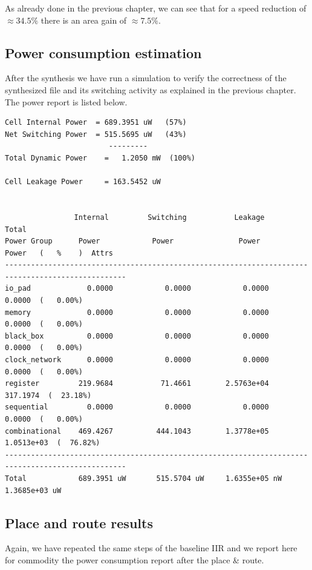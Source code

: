 As already done in the previous chapter, we can see that for a speed reduction of $\approx 34.5\%$ there is an area gain of $\approx 7.5\%$.

\subsection{Power consumption estimation}

After the synthesis we have run a simulation to verify the correctness of the synthesized file and its switching activity as explained in the previous
chapter. The power report is listed below.

\begin{Verbatim}[fontsize=\footnotesize]
Cell Internal Power  = 689.3951 uW   (57%)
Net Switching Power  = 515.5695 uW   (43%)
                        ---------
Total Dynamic Power    =   1.2050 mW  (100%)

Cell Leakage Power     = 163.5452 uW


                Internal         Switching           Leakage            Total
Power Group      Power            Power               Power              Power   (   %    )  Attrs
--------------------------------------------------------------------------------------------------
io_pad             0.0000            0.0000            0.0000            0.0000  (   0.00%)
memory             0.0000            0.0000            0.0000            0.0000  (   0.00%)
black_box          0.0000            0.0000            0.0000            0.0000  (   0.00%)
clock_network      0.0000            0.0000            0.0000            0.0000  (   0.00%)
register         219.9684           71.4661        2.5763e+04          317.1974  (  23.18%)
sequential         0.0000            0.0000            0.0000            0.0000  (   0.00%)
combinational    469.4267          444.1043        1.3778e+05        1.0513e+03  (  76.82%)
--------------------------------------------------------------------------------------------------
Total            689.3951 uW       515.5704 uW     1.6355e+05 nW     1.3685e+03 uW
\end{Verbatim}

\subsection{Place and route results}

Again, we have repeated the same steps of the baseline IIR and we report here for commodity the power consumption report after the place \& route.

